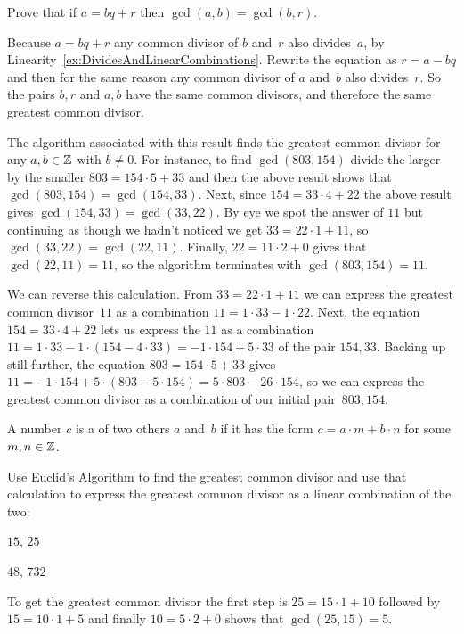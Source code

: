 \documentclass{test}  %
\begin{document}
\begin{bezoutproof}
\begin{problem}
Prove that if $a=bq+r$ then $\gcd(a,b)=\gcd(b,r)$.  
\begin{answer}
Because $a=bq+r$ any common divisor of $b$ and~$r$ also divides~$a$, 
by Linearity~\ref{ex:DividesAndLinearCombinations}.
Rewrite the equation as $r=a-bq$ and then for the same reason any
common divisor of $a$ and~$b$ also divides~$r$.
So the pairs $b,r$ and $a,b$ have the same common divisors, and
therefore the same greatest common divisor.
\end{answer}
\end{problem}

The algorithm associated with this result finds the greatest common
divisor for any $a,b\in\mathbb{Z}$ with $b\neq 0$.  
For instance, to find $\gcd(803,154)$ divide the larger by
the smaller $803=154\cdot 5+33$ and then the above result shows that  
$\gcd(803,154)=\gcd(154,33)$.
Next, since $154=33\cdot 4+22$ the above result gives
$\gcd(154,33)=\gcd(33,22)$.
By eye we spot the answer of $11$ but continuing as though we hadn't noticed
we get $33=22\cdot 1+11$, so $\gcd(33,22)=\gcd(22,11)$.
Finally, $22=11\cdot 2+0$ gives that 
$\gcd(22,11)=11$, so the algorithm terminates with $\gcd(803,154)=11$.

We can reverse this calculation.
From $33=22\cdot 1+11$ we can  
express the greatest common divisor~$11$ as a combination 
$11=1\cdot 33-1\cdot 22$.
Next, 
the equation $154=33\cdot 4+22$ lets us express
the $11$ as a combination 
$11=1\cdot 33-1\cdot (154-4\cdot 33)=-1\cdot 154+5\cdot 33$
of the pair $154,33$.
Backing up still further, the equation 
$803=154\cdot 5+33$
gives $11=-1\cdot 154+5\cdot (803-5\cdot 154)=5\cdot 803-26\cdot 154$, so 
we can express the greatest common divisor as a combination of our
initial pair~$803,154$.


\begin{df}
A number $c$ is a  of two others $a$ and~$b$
if it has the form $c=a\cdot m+b\cdot n$ for some $m,n\in\mathbb{Z}$.  
\end{df}

\begin{problem}
Use Euclid's Algorithm to find the greatest common divisor and 
use that calculation to express the greatest common divisor as a 
linear combination of the two:
\begin{items}
\item $15$, $25$
\item $48$, $732$
\end{items}
\begin{answer}
\begin{items}
\item To get the greatest common divisor the first step is
  $25=15\cdot 1+10$ followed by $15=10\cdot 1+5$ and finally
  $10=5\cdot 2+0$ shows that $\gcd(25,15)=5$.


\end{items}
\end{answer}
\end{problem}
\end{bezoutproof}
\end{document}
